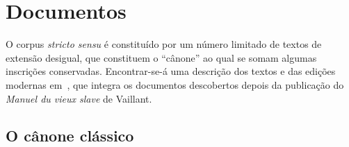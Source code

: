 \section{Documentos}

O corpus  \emph{stricto sensu} é constituído por um número limitado
de textos de extensão desigual, que constituem o ``cânone'' ao qual se somam
algumas inscrições conservadas.
Encontrar-se-á uma descrição dos textos e das edições modernas
em~\textcite[87--130]{BirnbaumSchaeken1999}, que integra os documentos
descobertos depois da publicação do \emph{Manuel du vieux slave} de Vaillant.

\subsection{O cânone clássico}

